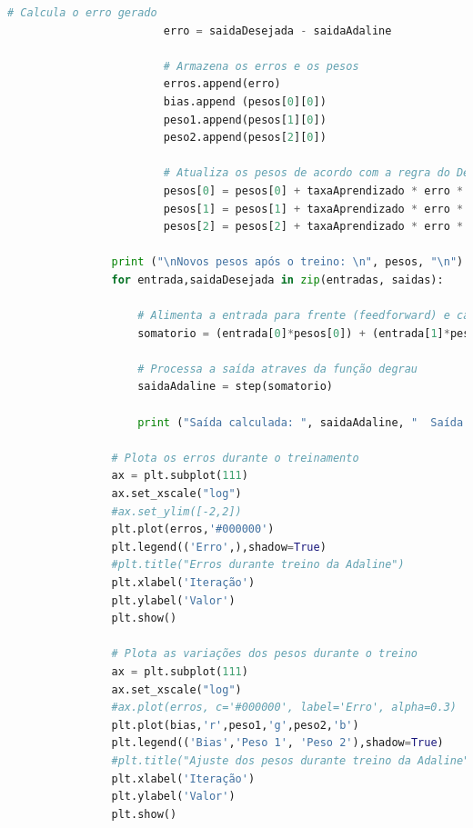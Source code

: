 \documentclass[a4paper,11pt]{article}
\begin{document}
\begin{lstlisting}[language=Python]
						# Calcula o erro gerado
						erro = saidaDesejada - saidaAdaline
						
						# Armazena os erros e os pesos
						erros.append(erro)
						bias.append (pesos[0][0])
						peso1.append(pesos[1][0])
						peso2.append(pesos[2][0])
						
						# Atualiza os pesos de acordo com a regra do Delta
						pesos[0] = pesos[0] + taxaAprendizado * erro * entrada[0]
						pesos[1] = pesos[1] + taxaAprendizado * erro * entrada[1]
						pesos[2] = pesos[2] + taxaAprendizado * erro * entrada[2]

				print ("\nNovos pesos após o treino: \n", pesos, "\n")
				for entrada,saidaDesejada in zip(entradas, saidas):
					
					# Alimenta a entrada para frente (feedforward) e calcula a saída da Adaline
					somatorio = (entrada[0]*pesos[0]) + (entrada[1]*pesos[1]) + (entrada[2]*pesos[2])

					# Processa a saída atraves da função degrau
					saidaAdaline = step(somatorio)

					print ("Saída calculada: ", saidaAdaline, "  Saída desejada: ", saidaDesejada)

				# Plota os erros durante o treinamento
				ax = plt.subplot(111)
				ax.set_xscale("log")
				#ax.set_ylim([-2,2])
				plt.plot(erros,'#000000')
				plt.legend(('Erro',),shadow=True)
				#plt.title("Erros durante treino da Adaline")
				plt.xlabel('Iteração')
				plt.ylabel('Valor')
				plt.show()

				# Plota as variações dos pesos durante o treino
				ax = plt.subplot(111)
				ax.set_xscale("log")
				#ax.plot(erros, c='#000000', label='Erro', alpha=0.3)
				plt.plot(bias,'r',peso1,'g',peso2,'b')
				plt.legend(('Bias','Peso 1', 'Peso 2'),shadow=True)
				#plt.title("Ajuste dos pesos durante treino da Adaline")
				plt.xlabel('Iteração')
				plt.ylabel('Valor')
				plt.show()
			\end{lstlisting}
\end{document}
